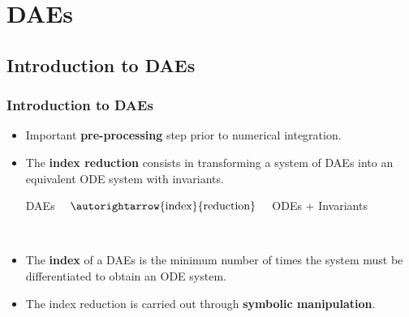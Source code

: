 
\section{\aclp{DAE}}

\begin{frame}
  \tableofcontents[currentsection]
\end{frame}

\subsection{Introduction to \aclp{DAE}}

\begin{frame}
  \frametitle{Introduction to \aclp{DAE}}
  \begin{itemize}
    \item Important \textbf{pre-processing} step prior to numerical integration.
    \\[1.0em]
    \item The \textbf{index reduction} consists in transforming a system of \acp{DAE} into an equivalent \ac{ODE} system with invariants.
    \\[0.5em]
    \begin{center}\begin{minipage}{7cm}\begin{bbox}{}
      \centering
      \acp{DAE} $\quad \autorightarrow{\text{index}}{\text{reduction}} \quad$ \acp{ODE} + Invariants
    \end{bbox}\end{minipage} \\[1.5em] \end{center}
    \item The \textbf{index} of a \acp{DAE} is the minimum number of times the system must be differentiated to obtain an \ac{ODE} system.
    \item The index reduction is carried out through \textbf{symbolic manipulation}.
  \end{itemize}
\end{frame}

